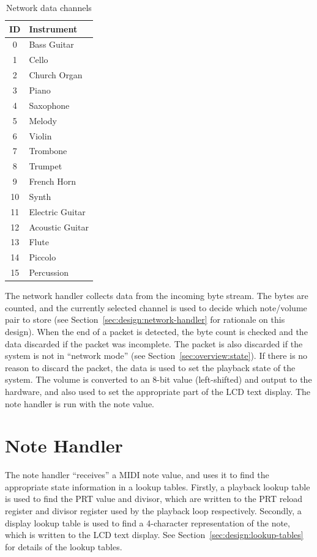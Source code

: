 \begin{nowordcount}
\begin{table}[htbp]
\centering
\begin{tabular}{c | l}
ID & Instrument \\
\hline\hline
0 & Bass Guitar \\
1 & Cello \\
2 & Church Organ \\
3 & Piano \\
4 & Saxophone \\
5 & Melody \\
6 & Violin \\
7 & Trombone \\
8 & Trumpet \\
9 & French Horn \\
10 & Synth \\
11 & Electric Guitar \\
12 & Acoustic Guitar \\
13 & Flute \\
14 & Piccolo \\
15 & Percussion
\end{tabular}
\caption{Network data channels}\label{tab:channelids}
\end{table}
\end{nowordcount}

The network handler collects data from the incoming byte stream.  The bytes are counted, and the 
currently selected channel is used to decide which note/volume pair to store (see 
Section~\ref{sec:design:network-handler} for rationale on this design).  When the end of a packet is 
detected, the byte count is checked and the data discarded if the packet was incomplete.  The packet 
is also discarded if the system is not in ``network mode'' (see Section~\ref{sec:overview:state}).
If there is no reason to discard the packet, the data is used to set the playback state of the 
system.  The volume is converted to an 8-bit value (left-shifted) and output to the hardware, and 
also used to set the appropriate part of the LCD text display.  The note handler is run with the 
note value.

\section{Note Handler}
\label{sec:overview:note-handler}

The note handler ``receives'' a MIDI note value, and uses it to find the appropriate state 
information in a lookup tables.  Firstly, a playback lookup table is used to find the PRT value and 
divisor, which are written to the PRT reload register and divisor register used by the playback loop 
respectively.  Secondly, a display lookup table is used to find a 4-character representation of the 
note, which is written to the LCD text display.  See Section~\ref{sec:design:lookup-tables} for 
details of the lookup tables.


